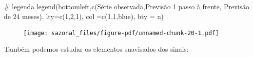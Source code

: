 \documentclass[
  letterpaper,
  DIV=11,
  numbers=noendperiod]{scrreprt}
\newenvironment{Shaded}{\begin{snugshade}}{\end{snugshade}}
\newcommand{\AttributeTok}[1]{\textcolor[rgb]{0.40,0.45,0.13}{#1}}
\newcommand{\CommentTok}[1]{\textcolor[rgb]{0.37,0.37,0.37}{#1}}
\newcommand{\DecValTok}[1]{\textcolor[rgb]{0.68,0.00,0.00}{#1}}
\newcommand{\FunctionTok}[1]{\textcolor[rgb]{0.28,0.35,0.67}{#1}}
\newcommand{\NormalTok}[1]{\textcolor[rgb]{0.00,0.23,0.31}{#1}}
\newcommand{\OtherTok}[1]{\textcolor[rgb]{0.00,0.23,0.31}{#1}}
\newcommand{\SpecialCharTok}[1]{\textcolor[rgb]{0.37,0.37,0.37}{#1}}
\newcommand{\StringTok}[1]{\textcolor[rgb]{0.13,0.47,0.30}{#1}}
\begin{document}
\begin{Shaded}
\begin{Highlighting}[]
\CommentTok{\# legenda}
\FunctionTok{legend}\NormalTok{(}\StringTok{\textquotesingle{}bottomleft\textquotesingle{}}\NormalTok{,}\FunctionTok{c}\NormalTok{(}\StringTok{\textquotesingle{}Série observada\textquotesingle{}}\NormalTok{,}\StringTok{\textquotesingle{}Previsão 1 passo à frente\textquotesingle{}}\NormalTok{, }\StringTok{\textquotesingle{}Previsão de 24 meses\textquotesingle{}}\NormalTok{), }\AttributeTok{lty=}\FunctionTok{c}\NormalTok{(}\DecValTok{1}\NormalTok{,}\DecValTok{2}\NormalTok{,}\DecValTok{1}\NormalTok{), }\AttributeTok{col =}\FunctionTok{c}\NormalTok{(}\DecValTok{1}\NormalTok{,}\DecValTok{1}\NormalTok{,}\StringTok{\textquotesingle{}blue\textquotesingle{}}\NormalTok{), }\AttributeTok{bty =} \StringTok{\textquotesingle{}n\textquotesingle{}}\NormalTok{)}
\end{Highlighting}
\end{Shaded}

\begin{figure}[H]

{\centering \texttt{[image: sazonal\_files/figure-pdf/unnamed-chunk-20-1.pdf]}

}

\end{figure}

Também podemos estudar os elementos suavisados dos sinais:

\begin{Shaded}
\end{Shaded}
\end{document}

